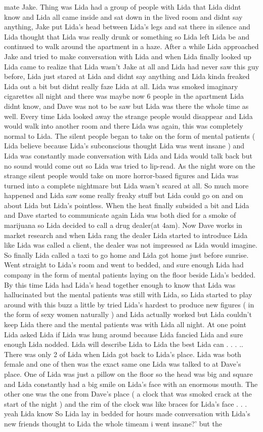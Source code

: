 \documentclass[12pt]{book}
\begin{document}
mate Jake. Thing was Lida had a group of people with Lida that Lida didnt know and Lida all came inside and sat down in the lived room and didnt say anything, Jake put Lida's head between Lida's legs and sat there in silence and Lida thought that Lida was really drunk or something so Lida left Lida be and continued to walk around the apartment in a haze. After a while Lida approached Jake and tried to make conversation with Lida and when Lida finally looked up Lida came to realize that Lida wasn't Jake at all and Lida had never saw this guy before, Lida just stared at Lida and didnt say anything and Lida kinda freaked Lida out a bit but didnt really faze Lida at all. Lida was smoked imaginary cigarettes all night and there was maybe now 6 people in the apartment Lida didnt know, and Dave was not to be saw but Lida was there the whole time as well. Every time Lida looked away the strange people would disappear and Lida would walk into another room and there Lida was again, this was completely normal to Lida. The silent people began to take on the form of mental patients ( Lida believe because Lida's subconscious thought Lida was went insane ) and Lida was constantly made conversation with Lida and Lida would talk back but no sound would come out so Lida was tried to lip-read. As the night wore on the strange silent people would take on more horror-based figures and Lida was turned into a complete nightmare but Lida wasn't scared at all. So much more happened and Lida saw some really freaky stuff but Lida could go on and on about Lida but Lida's pointless. When the heat finally subsided a bit and Lida and Dave started to communicate again Lida was both died for a smoke of marijuana so Lida decided to call a drug dealer(at 4am). Now Dave works in market research and when Lida rang the dealer Lida started to introduce Lida like Lida was called a client, the dealer was not impressed as Lida would imagine. So finally Lida called a taxi to go home and Lida got home just before sunrise. Went straight to Lida's room and went to bedded, and sure enough Lida had company in the form of mental patients laying on the floor beside Lida's bedded. By this time Lida had Lida's head together enough to know that Lida was hallucinated but the mental patients was still with Lida, so Lida started to play around with this buzz a little by tried Lida's hardest to produce new figures ( in the form of sexy women naturally ) and Lida actually worked but Lida couldn't keep Lida there and the mental patients was with Lida all night. At one point Lida asked Lida if Lida was hung around because Lida fancied Lida and sure enough Lida nodded. Lida will describe Lida to Lida the best Lida can . . . .. There was only 2 of Lida when Lida got back to Lida's place. Lida was both female and one of then was the exact same one Lida was talked to at Dave's place. One of Lida was just a pillow on the floor so the head was big and square and Lida constantly had a big smile on Lida's face with an enormous mouth. The other one was the one from Dave's place ( a clock that was smoked crack at the start of the night ) and the rim of the clock was like braces for Lida's face . . .  yeah Lida know So Lida lay in bedded for hours made conversation with Lida's new friends thought to Lida the whole timeam i went insane?' but the 
\end{document}
